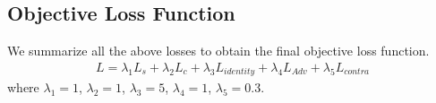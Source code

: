 \documentclass[times,twocolumn,final,authoryear]{elsarticle}
\begin{document}
\subsection{Objective Loss Function}
We summarize all the above losses to obtain the final objective loss function.
\begin{equation}
\begin{aligned}
L=\lambda_{1}L_s +\lambda_{2}L_c+\lambda_{3}L_{identity}+
\lambda_{4}L_{Adv} + \lambda_{5}L_{contra}
\end{aligned}
\end{equation}
where $\lambda_{1}=1$, $\lambda_{2}=1$, $\lambda_{3}=5$, $\lambda_{4}=1$, $\lambda_{5}=0.3$.
\end{document}
